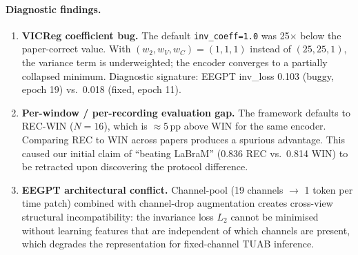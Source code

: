 \documentclass[11pt,a4paper]{article}
\begin{document}
\paragraph{Diagnostic findings.}
\begin{enumerate}[noitemsep]
  \item \textbf{VICReg coefficient bug.}
    The default \texttt{inv\_coeff=1.0} was 25$\times$ below the paper-correct value.
    With $(w_2, w_V, w_C) = (1,1,1)$ instead of $(25,25,1)$, the variance term is
    underweighted; the encoder converges to a partially collapsed minimum.
    Diagnostic signature: EEGPT inv\_loss 0.103 (buggy, epoch 19) vs.\ 0.018
    (fixed, epoch 11).

  \item \textbf{Per-window / per-recording evaluation gap.}
    The framework defaults to REC-WIN ($N{=}16$), which is $\approx 5$\,pp above WIN
    for the same encoder.  Comparing REC to WIN across papers produces a spurious
    advantage.  This caused our initial claim of ``beating LaBraM'' (0.836 REC vs.\
    0.814 WIN) to be retracted upon discovering the protocol difference.

  \item \textbf{EEGPT architectural conflict.}
    Channel-pool (19 channels $\to$ 1 token per time patch) combined with
    channel-drop augmentation creates cross-view structural incompatibility:
    the invariance loss $L_2$ cannot be minimised without learning features
    that are independent of which channels are present, which degrades the
    representation for fixed-channel TUAB inference.
\end{enumerate}
\end{document}
